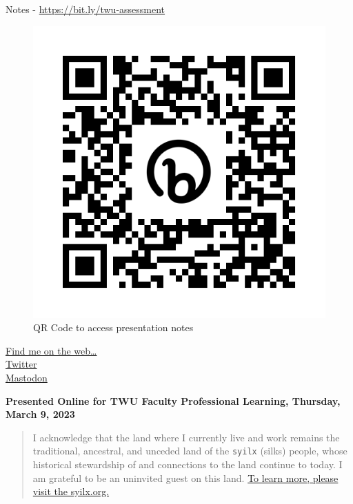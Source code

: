 \documentclass[
]{book}
\begin{document}
Notes - \url{https://bit.ly/twu-assessment}

\begin{figure}
\centering
\includegraphics{assets/twu-asmt/twu-asmt.png}
\caption{QR Code to access presentation notes}
\end{figure}

\href{https://cmad.land}{Find me on the web\ldots{}}\\
\href{https://twitter.com/colinmadland}{Twitter}\\
\href{https://scholar.social/web/@Cmadland}{Mastodon}

\textbf{Presented Online for TWU Faculty Professional Learning, Thursday, March 9, 2023}

\begin{quote}
I acknowledge that the land where I currently live and work remains the traditional, ancestral, and unceded land of the \texttt{syilx} (silks) people, whose historical stewardship of and connections to the land continue to today. I am grateful to be an uninvited guest on this land. \href{https:/syilx.org}{To learn more, please visit the syilx.org.}
\end{quote}
\end{document}
